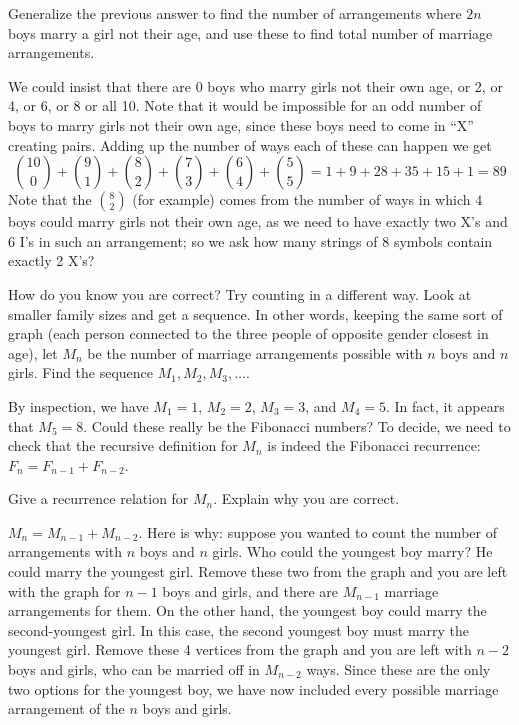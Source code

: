 \documentclass[11pt]{exam}
\begin{document}
\begin{questions}
\vfill

\question Generalize the previous answer to find the number of arrangements where $2n$ boys marry a girl not their age, and use these to find total number of marriage arrangements.

\begin{solution}
We could insist that there are 0 boys who marry girls not their own age, or 2, or 4, or 6, or 8 or all 10.  Note that it would be impossible for an odd number of boys to marry girls not their own age, since these boys need to come in ``X'' creating pairs.  Adding up the number of ways each of these can happen we get
\[{10 \choose 0} + {9 \choose 1} + {8 \choose 2} + {7 \choose 3} + {6 \choose 4} + {5 \choose 5} = 1 + 9 + 28 + 35 + 15 + 1 = 89\]
Note that the ${8 \choose 2}$ (for example) comes from the number of ways in which $4$ boys could marry girls not their own age, as we need to have exactly two X's and 6 I's in such an arrangement; so we ask how many strings of 8 symbols contain exactly 2 X's?
\end{solution}



\vfill

\newpage

\question How do you know you are correct?  Try counting in a different way.  Look at smaller family sizes and get a sequence.  In other words, keeping the same sort of graph (each person connected to the three people of opposite gender closest in age), let $M_n$ be the number of marriage arrangements possible with $n$ boys and $n$ girls.  Find the sequence $M_1, M_2, M_3,\ldots$.

\begin{solution}
By inspection, we have $M_1 = 1$, $M_2 = 2$, $M_3 = 3$, and $M_4 = 5$.  In fact, it appears that $M_5 = 8$.  Could these really be the Fibonacci numbers?  To decide, we need to check that the recursive definition for $M_n$ is indeed the Fibonacci recurrence: $F_n = F_{n-1} + F_{n-2}$.

\end{solution}

\vfill

\question Give a recurrence relation for $M_n$.  Explain why you are correct.

\begin{solution}
$M_n = M_{n-1} + M_{n-2}$.  Here is why: suppose you wanted to count the number of arrangements with $n$ boys and $n$ girls.  Who could the youngest boy marry?  He could marry the youngest girl.  Remove these two from the graph and you are left with the graph for $n-1$ boys and girls, and there are $M_{n-1}$ marriage arrangements for them.  On the other hand, the youngest boy could marry the second-youngest girl.  In this case, the second youngest boy must marry the youngest girl.  Remove these 4 vertices from the graph and you are left with $n-2$ boys and girls, who can be married off in $M_{n-2}$ ways.  Since these are the only two options for the youngest boy, we have now included every possible marriage arrangement of the $n$ boys and girls.
\end{solution}



\vfill




\end{questions}
\end{document}
